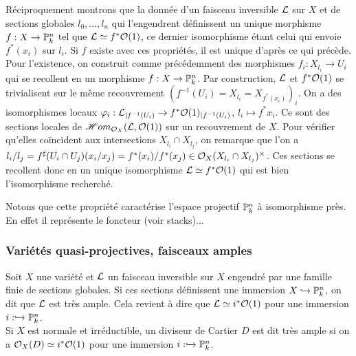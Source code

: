 Réciproquement montrons que la donnée d'un faisceau inversible $\mathcal{L}$ sur $X$ et de sections globales $l_0,...,l_n$ qui l'engendrent définissent un unique morphisme $f:X\rightarrow \mathbb{P}^n_k$ tel que $\mathcal{L}\simeq f^*\mathcal{O}(1)$, ce dernier isomorphisme étant celui qui envoie $f^*(x_i)$ sur $l_i$. Si $f$ existe avec ces propriétés, il est unique d'après ce qui précède. Pour l'existence, on construit comme précédemment des morphismes $f_i:X_{l_i}\rightarrow U_i$ qui se recollent en un morphisme $f:X\rightarrow \mathbb{P}^n_k$. Par construction, $\mathcal{L}$ et $f^*\mathcal{O}(1)$ se trivialisent sur le même recouvrement $(f^{-1}(U_i)=X_{l_i}=X_{f^*(x_i)})_i$. On a des isomorphismes locaux $\varphi_i:\mathcal{L}_{|f^{-1}(U_i)}\rightarrow f^*\mathcal{O}(1)_{|f^{-1}(U_i)}$, $l_i\mapsto f^*x_i$. Ce sont des sections locales de $\mathscr{H}om_{\mathcal{O}_X}(\mathcal{L},\mathcal{O}(1))$ sur un recouvrement de $X$. Pour vérifier qu'elles coïncident aux intersections $X_{l_i}\cap X_{l_j}$, on remarque que l'on a $l_i/l_j=f^\sharp(U_i\cap U_j)(x_i/x_j)= f^*(x_i)/f^*(x_j)\in \mathcal{O}_X(X_{l_i}\cap X_{l_j})^\times$. Ces sections se recollent donc en un unique isomorphisme $\mathcal{L}\simeq f^*\mathcal{O}(1)$ qui est bien l'isomorphisme recherché.

Notons que cette propriété caractérise l'espace projectif $\mathbb{P}^n_k$ à isomorphisme près. En effet il représente le foncteur (voir stacks)...

\subsubsection{Variétés quasi-projectives, faisceaux amples}


\begin{defn}
Soit $X$ une variété et $\mathcal{L}$ un faisceau inversible sur $X$ engendré par une famille finie de sections globales. Si ces sections définissent une immersion $X\xhookrightarrow{}\mathbb{P}_k^n$, on dit que $\mathcal{L}$ est très ample. Cela revient à dire que $\mathcal{L}\simeq i^*\mathcal{O}(1)$  pour une immersion $i:\xhookrightarrow{}\mathbb{P}_k^n$.\\
Si $X$ est normale et irréductible, un diviseur de Cartier $D$ est dit très ample si on a $\mathcal{O}_X(D)\simeq i^*\mathcal{O}(1)$ pour une immersion $i:\xhookrightarrow{}\mathbb{P}_k^n$.
\end{defn}

